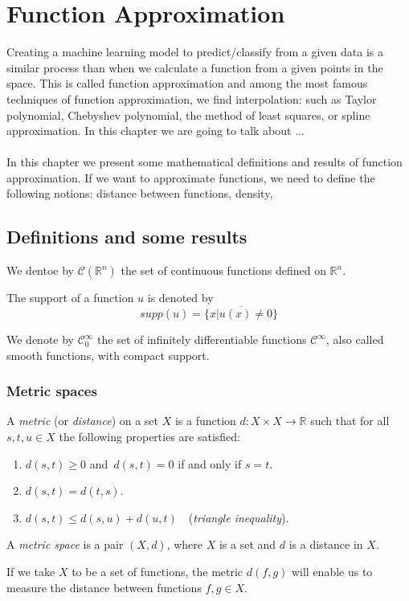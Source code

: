 \documentclass[../main.tex]{subfiles}
\begin{document}
\chapter{Function Approximation} \label{ch:methods}
\noindent Creating a machine learning model to predict/classify from a given data is a similar process than when we calculate a function from a given points in the space. This is called function approximation and among the most famous techniques of function approximation, we find interpolation: such as Taylor polynomial, Chebyshev polynomial, the method of least squares, or spline approximation. In this chapter we are going to talk about ...
\\ \\ 
\noindent In this chapter we present some mathematical definitions and results of function approximation. 
If we want to approximate functions, we need to define the following notions: distance between functions, density,
\section{Definitions and some results}

\begin{definition} We dentoe by $\mathcal{C}(\mathbb{R}^n)$ the set of continuous functions defined on $\mathbb{R}^n$.
\end{definition}
\begin{definition}
	The support of a function $u$ is denoted by $$supp(u)= \overline{\{x | u(x)\neq 0\}}$$
\end{definition}
\begin{definition} We denote by
	$ \mathcal{C}^\infty_0$ the set of infinitely differentiable functions $\mathcal{C}^\infty$, also called smooth functions, with compact support. 
\end{definition}

\subsection{Metric spaces}
\begin{definition}\label{thm:first}
	A \emph{metric} (or \emph{distance}) on a set $X$ is a function $d:X\times X\rightarrow \mathbb{R} $ such that for all $s,t, u\in X$ the following properties are satisfied:
	\begin{enumerate}
		\item $d(s,t) \geq 0$ and $ \, d(s,t)=0$ if and only if $ s=t$.
		\item $d(s,t)=d(t,s)$.
		\item $d(s,t)\leq d(s,u)+d(u,t)\quad$(\emph{triangle inequality}).
	\end{enumerate}
\begin{definition}
A \emph{metric space} is a pair $(X,d)$, where $X$ is a set and $d$ is a distance in $X$.
\end{definition}
\end{definition}
\noindent  If we take $X$ to be a set of functions, the metric $d(f,g)$ will enable us to measure the distance between functions $f,g \in X$.
\end{document}
